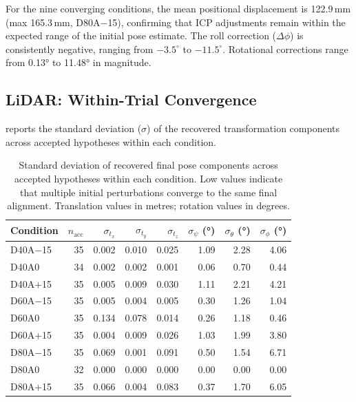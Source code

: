 For the nine converging conditions, the mean positional displacement is 122.9\,mm (max 165.3\,mm, D80A$-$15), confirming that ICP adjustments remain within the expected range of the initial pose estimate. The roll correction ($\Delta\phi$) is consistently negative, ranging from $-3.5^{\circ}$ to $-11.5^{\circ}$. Rotational corrections range from 0.13° to 11.48° in magnitude.

\subsection{LiDAR: Within-Trial Convergence}
\label{subsec:pa-results-lidar-convergence}

 reports the standard deviation ($\sigma$) of the recovered transformation components across accepted hypotheses within each condition.

\begin{table}[htbp]
  \centering
  \small
  \setlength{\tabcolsep}{3pt}
  \caption{Standard deviation of recovered final pose components across accepted hypotheses within each condition. Low values indicate that multiple initial perturbations converge to the same final alignment. Translation values in metres; rotation values in degrees.}
  \label{tab:pa-results-lidar-sigma}
  \begin{tabular}{@{} l r r r r r r r @{}}
    \toprule
    \textbf{Condition} &
    \boldmath$n_\text{acc}$ &
    \boldmath$\sigma_{t_x}$ &
    \boldmath$\sigma_{t_y}$ &
    \boldmath$\sigma_{t_z}$ &
    \boldmath$\sigma_{\psi}$ \textbf{(°)} &
    \boldmath$\sigma_{\theta}$ \textbf{(°)} &
    \boldmath$\sigma_{\phi}$ \textbf{(°)} \\
    \midrule
    D40A$-$15 & 35 & 0.002 & 0.010 & 0.025 & 1.09 & 2.28 & 4.06 \\
    D40A0     & 34 & 0.002 & 0.002 & 0.001 & 0.06 & 0.70 & 0.44 \\
    D40A$+$15 & 35 & 0.005 & 0.009 & 0.030 & 1.11 & 2.21 & 4.21 \\
    D60A$-$15 & 35 & 0.005 & 0.004 & 0.005 & 0.30 & 1.26 & 1.04 \\
    D60A0     & 35 & 0.134 & 0.078 & 0.014 & 0.26 & 1.18 & 0.46 \\
    D60A$+$15 & 35 & 0.004 & 0.009 & 0.026 & 1.03 & 1.99 & 3.80 \\
    D80A$-$15 & 35 & 0.069 & 0.001 & 0.091 & 0.50 & 1.54 & 6.71 \\
    D80A0     & 32 & 0.000 & 0.000 & 0.000 & 0.00 & 0.00 & 0.00 \\
    D80A$+$15 & 35 & 0.066 & 0.004 & 0.083 & 0.37 & 1.70 & 6.05 \\
    \bottomrule
  \end{tabular}
\end{table}

